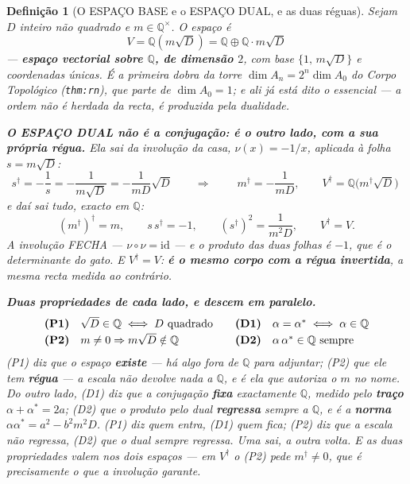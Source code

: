 \documentclass[11pt,a4paper]{article}
\newtheorem{definicao}{Definição}
\newcommand{\code}[1]{\texttt{\small #1}}
\newcommand{\dg}{^{\dagger}}
\begin{document}
\begin{definicao}[O ESPAÇO BASE e o ESPAÇO DUAL, e as duas réguas]\label{def:espaco}
Sejam $D$ inteiro \emph{não quadrado} e $m\in\mathbb{Q}^{\times}$. O espaço é
\[
\boxed{\;V=\mathbb{Q}(m\sqrt D)=\mathbb{Q}\oplus\mathbb{Q}\cdot m\sqrt D\;}
\]
--- \textbf{espaço vectorial sobre $\mathbb{Q}$, de dimensão $2$}, com base
$\{1,\,m\sqrt D\}$ e coordenadas únicas. É a \emph{primeira dobra} da torre
$\dim A_n=2^{n}\dim A_0$ do \emph{Corpo Topológico} (\code{thm:rn}), que parte de
$\dim A_0=1$; e ali já está dito o essencial --- \emph{a ordem não é herdada da recta, é
produzida pela dualidade}.

\textbf{O ESPAÇO DUAL não é a conjugação: é o outro lado, com a sua própria régua.} Ela sai
da involução da casa, $\nu(x)=-1/x$, aplicada à folha $s=m\sqrt D$:
\[
s\dg=-\frac1s=-\frac1{m\sqrt D}=-\frac{1}{mD}\sqrt D
\qquad\Longrightarrow\qquad
\boxed{\;m\dg=-\frac{1}{mD},\qquad V\dg=\mathbb{Q}\bigl(m\dg\sqrt D\bigr)\;}
\]
e daí sai tudo, exacto em $\mathbb{Q}$:
\[
(m\dg)\dg=m,\qquad
s\,s\dg=-1,\qquad
(s\dg)^{2}=\frac{1}{m^{2}D},\qquad
V\dg=V .
\]
\emph{A involução FECHA} --- $\nu\circ\nu=\mathrm{id}$ --- e o produto das duas folhas é
$-1$, que é o determinante do gato. E $V\dg=V$: \textbf{é o mesmo corpo com a régua
invertida}, a mesma recta medida ao contrário.

\textbf{Duas propriedades de cada lado, e descem em paralelo.}
\[
\begin{array}{ll@{\qquad}ll}
\textbf{(P1)} & \sqrt D\in\mathbb{Q}\iff D\ \text{quadrado} &
\textbf{(D1)} & \alpha=\alpha^{\ast}\iff\alpha\in\mathbb{Q}\\[2pt]
\textbf{(P2)} & m\neq0\Rightarrow m\sqrt D\notin\mathbb{Q} &
\textbf{(D2)} & \alpha\,\alpha^{\ast}\in\mathbb{Q}\ \text{sempre}
\end{array}
\]
(P1) diz que o espaço \textbf{existe} --- há algo fora de $\mathbb{Q}$ para adjuntar; (P2)
que ele tem \textbf{régua} --- a escala não devolve nada a $\mathbb{Q}$, e é ela que
autoriza o $m$ no nome. Do outro lado, (D1) diz que a conjugação \textbf{fixa} exactamente
$\mathbb{Q}$, medido pelo \textbf{traço} $\alpha+\alpha^{\ast}=2a$; (D2) que o produto pelo
dual \textbf{regressa} sempre a $\mathbb{Q}$, e é a \textbf{norma}
$\alpha\alpha^{\ast}=a^{2}-b^{2}m^{2}D$. \emph{(P1) diz quem entra, (D1) quem fica; (P2)
diz que a escala não regressa, (D2) que o dual sempre regressa.} Uma sai, a outra volta.
E as duas propriedades valem nos \emph{dois} espaços --- em $V\dg$ o (P2) pede
$m\dg\neq0$, que é precisamente o que a involução garante.


\end{definicao}
\end{document}
